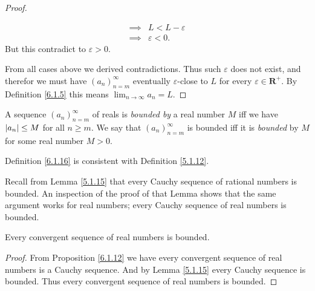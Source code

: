 \begin{proof}
\begin{itemize}
\begin{align*}
                  \implies & L < L - \varepsilon                                                                   \\
                  \implies & \varepsilon < 0.
              \end{align*}
              But this contradict to \(\varepsilon > 0\).
    \end{itemize}
    From all cases above we derived contradictions.
    Thus such \(\varepsilon\) does not exist, and therefor we must have \((a_n)_{n = m}^\infty\) eventually \(\varepsilon\)-close to \(L\) for every \(\varepsilon \in \mathbf{R}^+\).
    By Definition \ref{6.1.5} this means \(\lim_{n \to \infty} a_n = L\).
\end{proof}

\begin{definition}\label{6.1.16}
    A sequence \((a_n)_{n = m}^\infty\) of reals is \emph{bounded by} a real number \(M\) iff we have \(\abs*{a_n} \leq M\) for all \(n \geq m\).
    We say that \((a_n)_{n = m}^\infty\) is bounded iff it is \emph{bounded} by \(M\) for some real number \(M > 0\).
\end{definition}

\begin{note}
    Definition \ref{6.1.16} is consistent with Definition \ref{5.1.12}.
\end{note}

\begin{note}
    Recall from Lemma \ref{5.1.15} that every Cauchy sequence of rational numbers is bounded.
    An inspection of the proof of that Lemma shows that the same argument works for real numbers;
    every Cauchy sequence of real numbers is bounded.
\end{note}

\begin{corollary}\label{6.1.17}
    Every convergent sequence of real numbers is bounded.
\end{corollary}

\begin{proof}
    From Proposition \ref{6.1.12} we have every convergent sequence of real numbers is a Cauchy sequence.
    And by Lemma \ref{5.1.15} every Cauchy sequence is bounded.
    Thus every convergent sequence of real numbers is bounded.
\end{proof}


